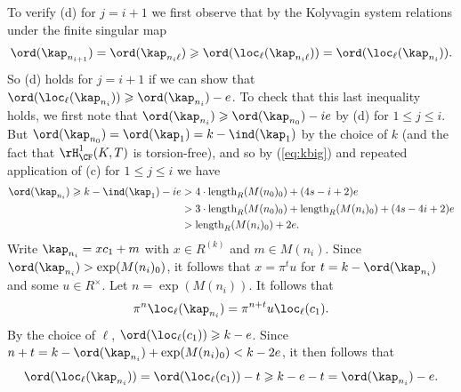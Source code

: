 To verify (d) for $j=i+1$ we first observe that by the Kolyvagin system relations under the finite singular map
$$
\ord(\kap_{n_{i+1}}) = \ord(\kap_{n_{i}\ell}) \geqslant \ord(\loc_{\ell}(\kap_{n_{i}\ell}))= \ord(\loc_\ell(\kap_{n_{i}})).
$$
So (d) holds for $j=i+1$ if we can show that $\ord(\loc_\ell(\kap_{n_{i}})) \geqslant \ord(\kap_{n_{i}})-e$.
To check that this last inequality holds, we first note that
$\ord(\kap_{n_{i}}) \geqslant \ord(\kap_{n_0}) - ie$ by (d) for $1\leqslant j \leqslant i$.
But $\ord(\kap_{n_0}) =\ord(\kap_1)= k-\ind(\kap_1)$ by the choice of $k$ (and the fact that $\rH^1_{\CF}(K,T)$ is torsion-free),
and so by (\ref{eq:kbig}) and repeated application of (c) for $1\leqslant j\leqslant i$ we have
\begin{equation*}\begin{split}
\ord(\kap_{n_i}) \geqslant k-\ind(\kap_1) - ie & >  4\cdot\mathrm{length}_R(M(n_0)_0)+(4s-i+2)e \\
& > 3\cdot\mathrm{length}_R(M(n_0)_0) + \mathrm{length}_R(M(n_i)_0) +(4s-4i+2) e  \\
& > \mathrm{length}_R(M(n_i)_0) + 2e.
\end{split}\end{equation*}
Write $\kap_{n_{i}} = x c_1 + m$ with $x\in R^{(k)}$ and $m\in M(n_i)$.
Since $\ord(\kap_{n_i}) > \exp(M(n_i)_0)$, it follows that
$x = \pi^t u$ for $t = k-\ord(\kap_{n_{i}})$ and some $u\in R^\times$. Let $n = \exp(M(n_{i}))$.
It follows that
$$
\pi^n\loc_\ell(\kap_{n_i}) = \pi^{n+t} u\loc_\ell(c_1).
$$
By the choice of $\ell$, $\ord(\loc_\ell(c_1)) \geqslant k - e$. Since $n+t = k - \ord(\kap_{n_i}) + \exp(M(n_i)_0)
<k - 2e$, it then follows
that
$$
\ord(\loc_\ell(\kap_{n_i})) = \ord(\loc_\ell(c_1)) - t \geqslant k - e -t = \ord(\kap_{n_i})-e.
$$




